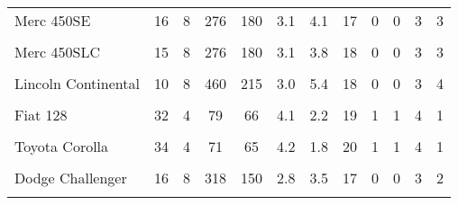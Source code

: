 \documentclass[
  12pt,
]{article}
\begin{document}
\begin{longtable}[t]{lccccccccccc}
Merc 450SE & 16 & 8 & 276 & 180 & 3.1 & 4.1 & 17 & 0 & 0 & 3 & 3\\
\cellcolor{gray!6}{Merc 450SL} & \cellcolor{gray!6}{17} & \cellcolor{gray!6}{8} & \cellcolor{gray!6}{276} & \cellcolor{gray!6}{180} & \cellcolor{gray!6}{3.1} & \cellcolor{gray!6}{3.7} & \cellcolor{gray!6}{18} & \cellcolor{gray!6}{0} & \cellcolor{gray!6}{0} & \cellcolor{gray!6}{3} & \cellcolor{gray!6}{3}\\
Merc 450SLC & 15 & 8 & 276 & 180 & 3.1 & 3.8 & 18 & 0 & 0 & 3 & 3\\
\cellcolor{gray!6}{Cadillac Fleetwood} & \cellcolor{gray!6}{10} & \cellcolor{gray!6}{8} & \cellcolor{gray!6}{472} & \cellcolor{gray!6}{205} & \cellcolor{gray!6}{2.9} & \cellcolor{gray!6}{5.2} & \cellcolor{gray!6}{18} & \cellcolor{gray!6}{0} & \cellcolor{gray!6}{0} & \cellcolor{gray!6}{3} & \cellcolor{gray!6}{4}\\
\addlinespace
Lincoln Continental & 10 & 8 & 460 & 215 & 3.0 & 5.4 & 18 & 0 & 0 & 3 & 4\\
\cellcolor{gray!6}{Chrysler Imperial} & \cellcolor{gray!6}{15} & \cellcolor{gray!6}{8} & \cellcolor{gray!6}{440} & \cellcolor{gray!6}{230} & \cellcolor{gray!6}{3.2} & \cellcolor{gray!6}{5.3} & \cellcolor{gray!6}{17} & \cellcolor{gray!6}{0} & \cellcolor{gray!6}{0} & \cellcolor{gray!6}{3} & \cellcolor{gray!6}{4}\\
Fiat 128 & 32 & 4 & 79 & 66 & 4.1 & 2.2 & 19 & 1 & 1 & 4 & 1\\
\cellcolor{gray!6}{Honda Civic} & \cellcolor{gray!6}{30} & \cellcolor{gray!6}{4} & \cellcolor{gray!6}{76} & \cellcolor{gray!6}{52} & \cellcolor{gray!6}{4.9} & \cellcolor{gray!6}{1.6} & \cellcolor{gray!6}{19} & \cellcolor{gray!6}{1} & \cellcolor{gray!6}{1} & \cellcolor{gray!6}{4} & \cellcolor{gray!6}{2}\\
Toyota Corolla & 34 & 4 & 71 & 65 & 4.2 & 1.8 & 20 & 1 & 1 & 4 & 1\\
\addlinespace
\cellcolor{gray!6}{Toyota Corona} & \cellcolor{gray!6}{22} & \cellcolor{gray!6}{4} & \cellcolor{gray!6}{120} & \cellcolor{gray!6}{97} & \cellcolor{gray!6}{3.7} & \cellcolor{gray!6}{2.5} & \cellcolor{gray!6}{20} & \cellcolor{gray!6}{1} & \cellcolor{gray!6}{0} & \cellcolor{gray!6}{3} & \cellcolor{gray!6}{1}\\
Dodge Challenger & 16 & 8 & 318 & 150 & 2.8 & 3.5 & 17 & 0 & 0 & 3 & 2\\
\cellcolor{gray!6}{AMC Javelin} & \cellcolor{gray!6}{15} & \cellcolor{gray!6}{8} & \cellcolor{gray!6}{304} & \cellcolor{gray!6}{150} & \cellcolor{gray!6}{3.1} & \cellcolor{gray!6}{3.4} & \cellcolor{gray!6}{17} & \cellcolor{gray!6}{0} & \cellcolor{gray!6}{0} & \cellcolor{gray!6}{3} & \cellcolor{gray!6}{2}\\

\end{longtable}
\end{document}
